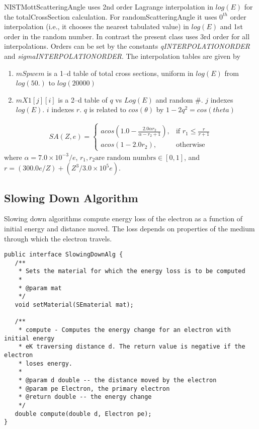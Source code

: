 NISTMottScatteringAngle uses 2nd order Lagrange interpolation in $log(E)$ for the totalCrossSection calculation. For randomScatteringAngle it uses $0^{th}$ order interpolation (i.e., it chooses the nearest tabulated value) in $log(E)$ and 1st order in the random number. In contrast the present class uses 3rd order for all interpolations. Orders can be set by the constants \textit{qINTERPOLATIONORDER} and \textit{sigmaINTERPOLATIONORDER}. The interpolation tables are given by
\begin{enumerate}
\item $mSpwem$ is a 1--d table of total cross sections, uniform in $log(E)$ from $log(50.)$ to $log(20000)$
\item $mX1[j][i]$ is a 2--d table of $q$ vs $Log(E)$ and random \#. $j$ indexes $log(E)$. $i$ indexes $r$. $q$ is related to $cos(\theta)$ by $1-2q^2=cos(theta)$
\end{enumerate}


\begin{align*}
    SA(Z, e)= 
\begin{cases}
    acos\left (1.0 - \frac{2.0 \alpha r_2}{\alpha - r_2 + 1}\right ), & \text{if } r_1 \leq \frac{r}{r+1}\\
    acos(1-2.0r_2), & \text{otherwise}
\end{cases}
\end{align*}
where $\alpha = 7.0\times 10^{-3}/e$, $r_1, r_2 \text{are random numbrs} \in [0, 1]$, and $r = (300.0 e / Z) + (Z^3 / 3.0\times 10^5 e)$.

\subsection{Slowing Down Algorithm}\label{impl:sda}
Slowing down algorithms compute energy loss of the electron as a function of initial energy and distance moved. The loss depends on properties of the medium through which the electron travels. 

\begin{lstlisting}
public interface SlowingDownAlg {
   /**
    * Sets the material for which the energy loss is to be computed
    *
    * @param mat
    */
   void setMaterial(SEmaterial mat);

   /**
    * compute - Computes the energy change for an electron with initial energy
    * eK traversing distance d. The return value is negative if the electron
    * loses energy.
    *
    * @param d double -- the distance moved by the electron
    * @param pe Electron, the primary electron
    * @return double -- the energy change
    */
   double compute(double d, Electron pe);
}
\end{lstlisting}

